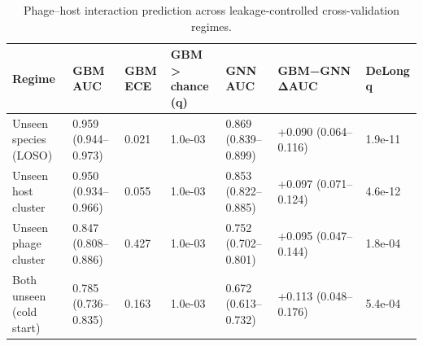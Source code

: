 \begin{table}
\caption{Phage–host interaction prediction across leakage-controlled cross-validation regimes.}
\label{tab:main}
\begin{tabular}{lllllll}
\toprule
Regime & GBM AUC & GBM ECE & GBM > chance (q) & GNN AUC & GBM−GNN ΔAUC & DeLong q \\
\midrule
Unseen species (LOSO) & 0.959 (0.944–0.973) & 0.021 & 1.0e-03 & 0.869 (0.839–0.899) & +0.090 (0.064–0.116) & 1.9e-11 \\
Unseen host cluster & 0.950 (0.934–0.966) & 0.055 & 1.0e-03 & 0.853 (0.822–0.885) & +0.097 (0.071–0.124) & 4.6e-12 \\
Unseen phage cluster & 0.847 (0.808–0.886) & 0.427 & 1.0e-03 & 0.752 (0.702–0.801) & +0.095 (0.047–0.144) & 1.8e-04 \\
Both unseen (cold start) & 0.785 (0.736–0.835) & 0.163 & 1.0e-03 & 0.672 (0.613–0.732) & +0.113 (0.048–0.176) & 5.4e-04 \\
\bottomrule
\end{tabular}
\end{table}
